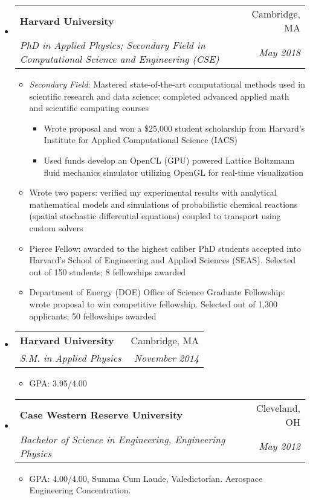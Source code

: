 \documentclass[letterpaper,11pt]{article}
\makeatletter
\newcommand{\resitem}[1]{\item #1 \vspace{-2pt}}
\newcommand{\ressubheading}[4]{\vspace{-14pt}
\begin{tabular*}{7.0in}{l@{\extracolsep{\fill}}r}
                \\
                \textbf{#1} & #2 \\
                \textit{#3} & \textit{#4} \\
\end{tabular*}\vspace{-6pt}}
\makeatother
\begin{document}
\begin{itemize}
\item \ressubheading{Harvard University}{Cambridge, MA}{PhD in Applied Physics; Secondary Field in Computational Science and Engineering (CSE)}{May 2018}     
\begin{itemize}

\resitem{\textit{Secondary Field}: Mastered state-of-the-art computational methods used in scientific research and data science; completed advanced applied math and scientific computing courses} 

\begin{itemize}
\resitem{Wrote proposal and won a \$25,000 student scholarship from Harvard's Institute for Applied Computational Science (IACS)}
\resitem{Used funds develop an OpenCL (GPU) powered Lattice Boltzmann fluid mechanics simulator utilizing OpenGL for real-time visualization}
\end{itemize}

\resitem{Wrote two papers: verified my experimental results with analytical mathematical models and simulations of probabilistic chemical reactions (spatial stochastic differential equations) coupled to transport using custom solvers}

\resitem{Pierce Fellow: awarded to the highest caliber PhD students accepted into Harvard's School of Engineering and Applied Sciences (SEAS). Selected out of 150 students; 8 fellowships awarded}

\resitem{Department of Energy (DOE) Office of Science Graduate Fellowship: wrote proposal to win competitive fellowship. Selected out of 1,300 applicants; 50 fellowships awarded}

\end{itemize}
              
\item \ressubheading{Harvard University}{Cambridge, MA}{S.M. in Applied Physics}{November 2014}
        \begin{itemize}
        \resitem{GPA: 3.95/4.00}
        \end{itemize}
\item
        \ressubheading{Case Western Reserve University}{Cleveland, OH}{Bachelor of Science in Engineering, Engineering Physics}{May 2012}
        \begin{itemize}
                \resitem{GPA: 4.00/4.00, Summa Cum Laude, Valedictorian. Aerospace Engineering Concentration. }
        \end{itemize}
\end{itemize}
\end{document}
